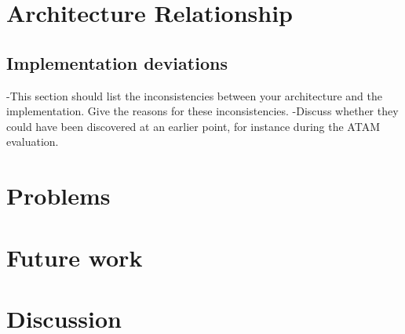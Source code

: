 \documentclass[12pt, a4paper]{article}
\begin{document}
\section{Architecture Relationship}
\subsection{Implementation deviations}
-This section should list the inconsistencies between your architecture and 
the implementation. Give the reasons for these inconsistencies. 
-Discuss whether they could have been discovered at an earlier point, for
instance during the ATAM evaluation.

\section{Problems}
\section{Future work}
\section{Discussion}
\end{document}
